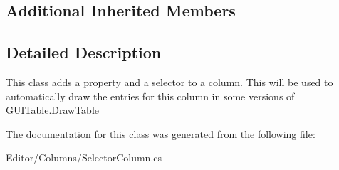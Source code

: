 \subsection*{Additional Inherited Members}


\subsection{Detailed Description}
This class adds a property and a selector to a column. This will be used to automatically draw the entries for this column in some versions of G\+U\+I\+Table.\+Draw\+Table 



The documentation for this class was generated from the following file\+:\begin{DoxyCompactItemize}
\item 
Editor/\+Columns/Selector\+Column.\+cs\end{DoxyCompactItemize}
